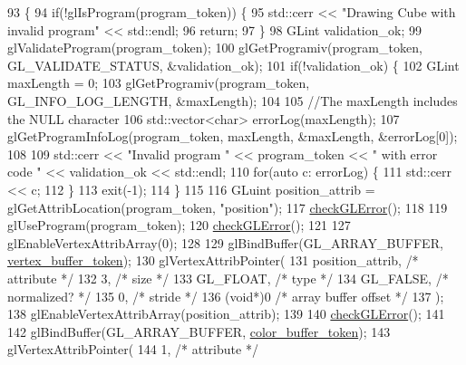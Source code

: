 \begin{DoxyCode}
93                                          \{
94   \textcolor{keywordflow}{if}(!glIsProgram(program\_token)) \{
95     std::cerr << \textcolor{stringliteral}{"Drawing Cube with invalid program"} << std::endl;
96     \textcolor{keywordflow}{return};
97   \}
98   GLint validation\_ok;
99   glValidateProgram(program\_token);
100   glGetProgramiv(program\_token, GL\_VALIDATE\_STATUS, &validation\_ok);
101   \textcolor{keywordflow}{if}(!validation\_ok) \{
102     GLint maxLength = 0;
103     glGetProgramiv(program\_token, GL\_INFO\_LOG\_LENGTH, &maxLength);
104 
105     \textcolor{comment}{//The maxLength includes the NULL character}
106     std::vector<char> errorLog(maxLength);
107     glGetProgramInfoLog(program\_token, maxLength, &maxLength, &errorLog[0]);
108 
109     std::cerr << \textcolor{stringliteral}{"Invalid program "} << program\_token << \textcolor{stringliteral}{" with error code "} << validation\_ok << std::endl;
110     \textcolor{keywordflow}{for}(\textcolor{keyword}{auto} c: errorLog) \{
111       std::cerr << c;
112     \}
113     exit(-1);
114   \}
115 
116   GLuint position\_attrib = glGetAttribLocation(program\_token, \textcolor{stringliteral}{"position"});
117   \hyperlink{CubeAsset_8cc_a75f201b0e53e68726854997957322b8d}{checkGLError}();
118 
119   glUseProgram(program\_token);
120   \hyperlink{CubeAsset_8cc_a75f201b0e53e68726854997957322b8d}{checkGLError}();
121 
127   glEnableVertexAttribArray(0);
128 
129   glBindBuffer(GL\_ARRAY\_BUFFER, \hyperlink{classCubeAsset_a31bd098f60e2c24988316a9cc9335987}{vertex\_buffer\_token});
130   glVertexAttribPointer(
131                         position\_attrib,               \textcolor{comment}{/* attribute */}
132                         3,                             \textcolor{comment}{/* size */}
133                         GL\_FLOAT,                      \textcolor{comment}{/* type */}
134                         GL\_FALSE,                      \textcolor{comment}{/* normalized? */}
135                         0,                             \textcolor{comment}{/* stride */}
136                         (\textcolor{keywordtype}{void}*)0                       \textcolor{comment}{/* array buffer offset */}
137                         );
138   glEnableVertexAttribArray(position\_attrib);
139 
140   \hyperlink{CubeAsset_8cc_a75f201b0e53e68726854997957322b8d}{checkGLError}();
141 
142   glBindBuffer(GL\_ARRAY\_BUFFER, \hyperlink{classCubeAsset_a4cb558d463a5fa01ba7fdd884e697a73}{color\_buffer\_token});
143   glVertexAttribPointer(
144                         1,                             \textcolor{comment}{/* attribute */}

\end{DoxyCode}
